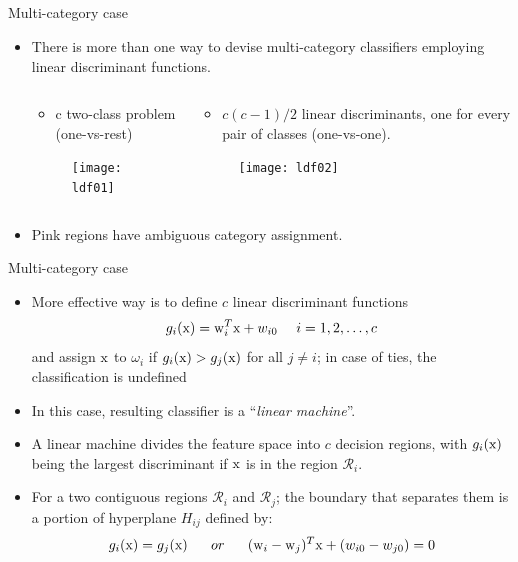 \subsection{}
\begin{frame}{Multi-category case}
\begin{itemize}
\item There is more than one way to devise multi-category classifiers employing linear discriminant functions.
\begin{columns}
\begin{column}{4cm}
\begin{itemize}
\item c two-class problem ({\color{mycolor1}one-vs-rest})
\end{itemize}
\begin{figure}
\texttt{[image: ldf01]}
\end{figure}
\end{column}
\begin{column}{5cm}
\begin{itemize}
\item $c(c-1)/2$ linear discriminants, one for every pair of classes ({\color{mycolor1}one-vs-one}).
\end{itemize}
\begin{figure}
\texttt{[image: ldf02]}
\end{figure}
\end{column}
\end{columns}

\item Pink regions have ambiguous category assignment.
\end{itemize}
\end{frame}

\begin{frame}{Multi-category case}
\begin{itemize}
\item More effective way is to define $c$ linear discriminant functions
\begin{equation}
g_i({\rm x})={\rm w}^T_i{\rm x}+w_{i0}~~~~i=1,2,\ldots,c \nonumber
\end{equation}
	and assign ${\rm x}$ to $\omega_i$ if $g_i({\rm x}) > g_j({\rm x})$ for all $j\neq i$; in case of ties, the classification is undefined
\item In this case, resulting classifier is a ``\textit{\color{mycolor2}linear machine}''.
\item A linear machine divides the feature space into $c$ decision regions, with $g_i({\rm x})$ being the largest discriminant if ${\rm x}$ is in the region $\mathcal{R}_i$.
\item For a two contiguous regions $\mathcal{R}_i$ and $\mathcal{R}_j$; the boundary that separates them is a portion of hyperplane $H_{ij}$ defined by:
\begin{equation}
g_i({\rm x})=g_j({\rm x})~~~~~or~~~~~({\rm w}_i-{\rm w}_j)^T{\rm x}+(w_{i0}-w_{j0})=0 \nonumber
\end{equation}
\end{itemize}
\end{frame}

